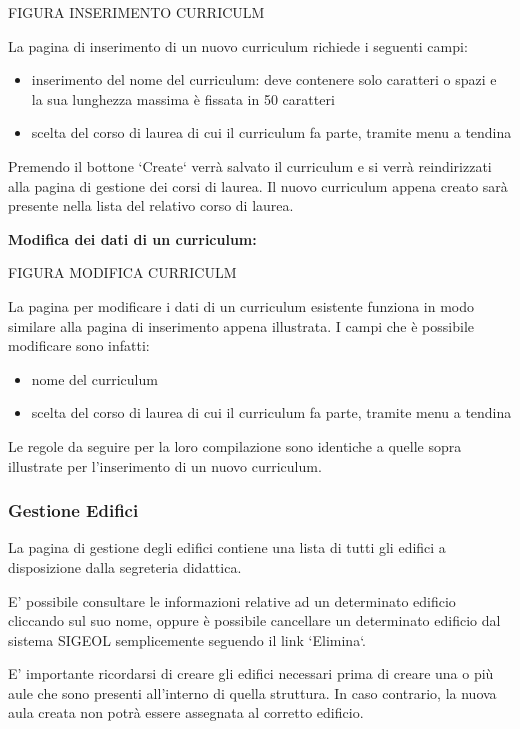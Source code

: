 \documentclass[11pt,a4paper]{article}
\begin{document}
\begin{LARGE}FIGURA INSERIMENTO CURRICULM\end{LARGE}

La pagina di inserimento di un nuovo curriculum richiede i seguenti campi:
\begin{itemize}
 \item inserimento del nome del curriculum: deve contenere solo caratteri o spazi e la sua lunghezza massima è fissata in 50 caratteri
 \item scelta del corso di laurea di cui il curriculum fa parte, tramite menu a tendina
\end{itemize}
Premendo il bottone `Create` verrà salvato il curriculum e si verrà reindirizzati alla pagina di gestione dei corsi di laurea. Il nuovo curriculum appena creato sarà presente nella lista del relativo corso di laurea.
\newline \newline
\begin{large}\textbf{Modifica dei dati di un curriculum:}\end{large}

\begin{LARGE}FIGURA MODIFICA CURRICULM\end{LARGE}

La pagina per modificare i dati di un curriculum esistente funziona in modo similare alla pagina di inserimento appena illustrata. I campi che è possibile modificare sono infatti:
\begin{itemize}
 \item nome del curriculum
 \item scelta del corso di laurea di cui il curriculum fa parte, tramite menu a tendina
\end{itemize}
Le regole da seguire per la loro compilazione sono identiche a quelle sopra illustrate per l'inserimento di un nuovo curriculum.
\subsubsection{Gestione Edifici}
La pagina di gestione degli edifici contiene una lista di tutti gli edifici a disposizione dalla segreteria didattica.

E' possibile consultare le informazioni relative ad un determinato edificio cliccando sul suo nome, oppure è possibile cancellare un determinato edificio dal sistema SIGEOL semplicemente seguendo il link `Elimina`.

E' importante ricordarsi di creare gli edifici necessari prima di creare una o più aule che sono presenti all'interno di quella struttura. In caso contrario, la nuova aula creata non potrà essere assegnata al corretto edificio.
\end{document}
